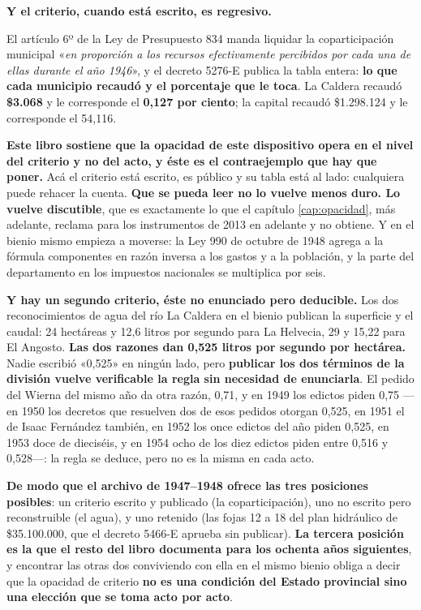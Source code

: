 \begin{cautela}
\textbf{Y el criterio, cuando está escrito, es regresivo.}

El artículo 6º de la Ley de Presupuesto 834 manda liquidar la coparticipación municipal
«\textit{en proporción a los recursos efectivamente percibidos por cada una de ellas durante
el año 1946}», y el decreto 5276-E publica la tabla entera: \textbf{lo que cada municipio
recaudó y el porcentaje que le toca}. La Caldera recaudó \textbf{\$3.068} y le corresponde el
\textbf{0,127 por ciento}; la capital recaudó \$1.298.124 y le corresponde el 54,116.

\textbf{Este libro sostiene que la opacidad de este dispositivo opera en el nivel del criterio
y no del acto, y éste es el contraejemplo que hay que poner.} Acá el criterio está escrito, es
público y su tabla está al lado: cualquiera puede rehacer la cuenta. \textbf{Que se pueda leer
no lo vuelve menos duro. Lo vuelve discutible}, que es exactamente lo que el capítulo
\ref{cap:opacidad}, más adelante, reclama para los instrumentos de 2013 en adelante y no obtiene. Y en el bienio mismo empieza a moverse: la Ley 990 de octubre de 1948 agrega a la fórmula
componentes en razón inversa a los gastos y a la población, y la parte del departamento en los
impuestos nacionales se multiplica por seis.

\textbf{Y hay un segundo criterio, éste no enunciado pero deducible.} Los dos reconocimientos
de agua del río La Caldera en el bienio publican la superficie y el caudal: 24 hectáreas y 12,6 litros por segundo
para La Helvecia, 29 y 15,22 para El Angosto. \textbf{Las dos razones dan 0,525 litros por
segundo por hectárea.} Nadie escribió «0,525» en ningún lado, pero \textbf{publicar los dos
términos de la división vuelve verificable la regla sin necesidad de enunciarla}. El pedido del
Wierna del mismo año da otra razón, 0,71, y en 1949 los edictos piden 0,75 ---en 1950 los decretos
que resuelven dos de esos pedidos otorgan 0,525, en 1951 el de Isaac Fernández también, en 1952 los once edictos del año piden 0,525, en 1953 doce de dieciséis, y en 1954 ocho de los diez edictos piden entre 0,516 y 0,528---: la regla se deduce, pero no es la misma en cada acto.

\textbf{De modo que el archivo de 1947--1948 ofrece las tres posiciones posibles}: un criterio
escrito y publicado (la coparticipación), uno no escrito pero reconstruible (el agua), y uno
retenido (las fojas 12 a 18 del plan hidráulico de \$35.100.000, que el decreto 5466-E aprueba
sin publicar). \textbf{La tercera posición es la que el resto del libro documenta para los
ochenta años siguientes}, y encontrar las otras dos conviviendo con ella en el mismo bienio
obliga a decir que la opacidad de criterio \textbf{no es una condición del Estado provincial
sino una elección que se toma acto por acto}.
\end{cautela}

